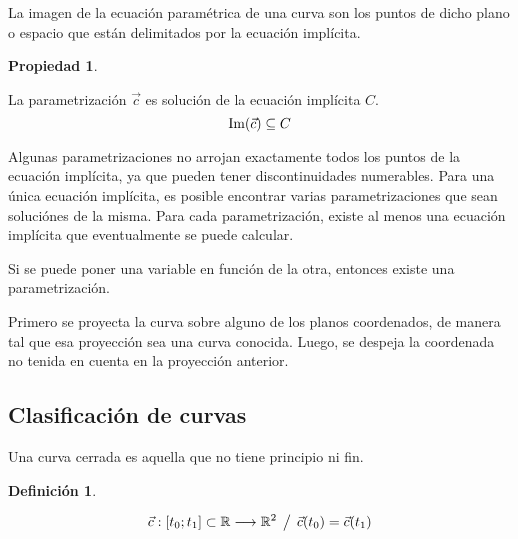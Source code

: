 \documentclass[a5paper,12pt,twoside]{book}
\newtheorem{defn}{{Definición}}[chapter]
\newtheorem{prop}{{Propiedad}}[chapter]
\begin{document}
La imagen de la ecuación paramétrica de una curva son los puntos de dicho plano o espacio que están delimitados por la ecuación implícita.

\begin{mdframed}[style=MyFrame1]
    \begin{prop}
    \end{prop}
    La parametrización $\Vec{c}$ es solución de la ecuación implícita $C$.
    \begin{equation*}
        \operatorname{Im} (\Vec{c}) \subseteq C
    \end{equation*}
\end{mdframed}

Algunas parametrizaciones no arrojan exactamente todos los puntos de la ecuación implícita, ya que pueden tener discontinuidades numerables. Para una única ecuación implícita, es posible encontrar varias parametrizaciones que sean soluciónes de la misma. Para cada parametrización, existe al menos una ecuación implícita que eventualmente se puede calcular.


Si se puede poner una variable en función de la otra, entonces existe una parametrización.


Primero se proyecta la curva sobre alguno de los planos coordenados, de manera tal que esa proyección sea una curva conocida. Luego, se despeja la coordenada no tenida en cuenta en la proyección anterior.


\subsection{Clasificación de curvas}

Una curva cerrada es aquella que no tiene principio ni fin.

\begin{mdframed}[style=MyFrame1]
    \begin{defn}
    \end{defn}
    \begin{equation*}
        \Vec{c}: [t_0;t_1] \subset \mathbb{R} \longrightarrow \mathbb{R}^2 \hspace{1ex} \big/ \hspace{1ex} \Vec{c}(t_0) = \Vec{c}(t_1)
    \end{equation*}
\end{mdframed}
\end{document}
